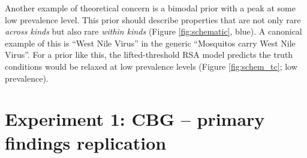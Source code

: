 \documentclass[10pt,letterpaper]{article}
\begin{document}
Another example of theoretical concern is a bimodal prior with a peak at some low prevalence level. This prior should describe properties that are not only rare \emph{across kinds} but also rare \emph{within kinds} (Figure \ref{fig:schematic}, blue). A canonical example of this is ``West Nile Virus'' in the generic ``Mosquitos carry West Nile Virus''. For a prior like this, the lifted-threshold RSA model predicts the truth conditions would be relaxed at low prevalence levels (Figure \ref{fig:schem_tc}; low prevalence). 

%







\section{Experiment 1: CBG -- primary findings replication}
\end{document}
